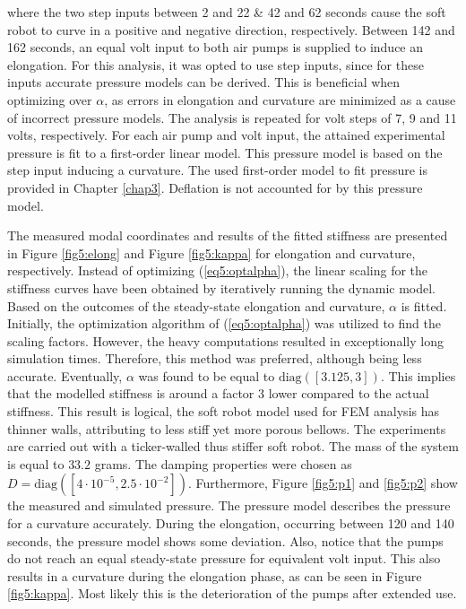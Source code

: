 where the two step inputs between 2 and 22 \& 42 and 62 seconds cause the soft robot to curve in a positive and negative direction, respectively. Between 142 and 162 seconds, an equal volt input to both air pumps is supplied to induce an elongation. For this analysis, it was opted to use step inputs, since for these inputs accurate pressure models can be derived. This is beneficial when optimizing over $\alpha$, as errors in elongation and curvature are minimized as a cause of incorrect pressure models. The analysis is repeated for volt steps of 7, 9 and 11 volts, respectively. For each air pump and volt input, the attained experimental pressure is fit to a first-order linear model. This pressure model is based on the step input inducing a curvature. The used first-order model to fit pressure is provided in Chapter \ref{chap3}. Deflation is not accounted for by this pressure model. 

The measured modal coordinates and results of the fitted stiffness are presented in Figure \ref{fig5:elong} and Figure \ref{fig5:kappa} for elongation and curvature, respectively. Instead of optimizing (\ref{eq5:optalpha}), the linear scaling for the stiffness curves have been obtained by iteratively running the dynamic model. Based on the outcomes of the steady-state elongation and curvature, $\alpha$ is fitted. Initially, the optimization algorithm of (\ref{eq5:optalpha}) was utilized to find the scaling factors. However, the heavy computations resulted in exceptionally long simulation times. Therefore, this method was preferred, although being less accurate. Eventually, $\alpha$ was found to be equal to $\text{diag}([3.125,3])$. This implies that the modelled stiffness is around a factor 3 lower compared to the actual stiffness. This result is logical, the soft robot model used for FEM analysis has thinner walls, attributing to less stiff yet more porous bellows. The experiments are carried out with a ticker-walled thus stiffer soft robot. The mass of the system is equal to $33.2$ grams. The damping properties were chosen as $D = \text{diag}([4\cdot 10^{-5},2.5\cdot 10^{-2}])$. Furthermore, Figure \ref{fig5:p1} and \ref{fig5:p2} show the measured and simulated pressure. The pressure model describes the pressure for a curvature accurately. During the elongation, occurring between 120 and 140 seconds, the pressure model shows some deviation. Also, notice that the pumps do not reach an equal steady-state pressure for equivalent volt input. This also results in a curvature during the elongation phase, as can be seen in Figure \ref{fig5:kappa}. Most likely this is the deterioration of the pumps after extended use. 

